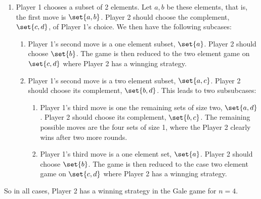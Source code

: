 \documentclass[handout]{mcs}
\begin{document}
\begin{problem}
{\begin{enumerate}
\item Player 1 chooses a subset of 2 elements.  Let $a,b$ be these
elements, that is, the first move is $\set{a,b}$.  Player 2 should choose
the complement, $\set{c,d}$, of Player 1's choice.  We then have the
following subcases:
\begin{enumerate}

\item Player 1's second move is a one element subset, $\set{a}$.  Player 2
should choose $\set{b}$.  The game is then reduced to the two element game
on $\set{c,d}$ where Player 2 has a winnging strategy.

\item
Player 1's second move is a two element subset, $\set{a,c}$.  Player 2
should choose its complement, $\set{b,d}$.  This leads to two subsubcases:
\begin{enumerate}

\item Player 1's third move is one the remaining sets of size two,
$\set{a,d}$.  Player 2 should choose its complement, $\set{b,c}$.  The
remaining possible moves are the four sets of size 1, where the Player 2
clearly wins after two more rounds.

\item Player 1's third move is a one element set, $\set{a}$.  Player 2
should choose $\set{b}$.  The game is then reduced to the case two element
game on $\set{c,d}$ where Player 2 has a winnging strategy.
\end{enumerate}
\end{enumerate}
\end{enumerate}
So in all cases, Player 2 has a winning strategy in the Gale game for
$n=4$.}



\end{problem}


\end{document}
